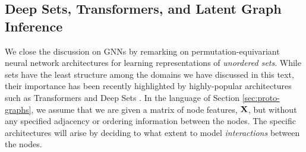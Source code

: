 %
%
 

\subsection{Deep Sets, Transformers, and Latent Graph Inference}
\label{sec:deepset}

We close the discussion on GNNs by remarking on permutation-equivariant neural network architectures for learning representations of \emph{unordered sets}. While sets have the least structure among the domains we have discussed in this text, their importance has been recently highlighted by highly-popular architectures such as Transformers \citep{vaswani2017attention} and Deep Sets \citep{zaheer2017deep}. 
%
%
In the language of Section \ref{sec:proto-graphs}, we assume that we are given a matrix of node features, ${\bf X}$, but without any specified adjacency or ordering information between the nodes. The specific architectures will arise by deciding to what extent to model \emph{interactions} between the nodes.
 
